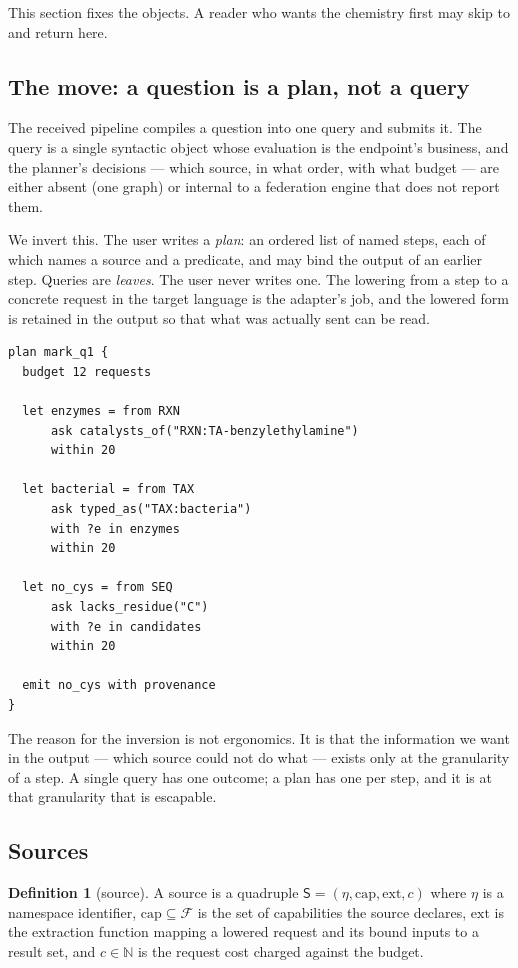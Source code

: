 \documentclass[11pt,a4paper]{article}
\theoremstyle{plain}
\theoremstyle{definition}
\newtheorem{definition}[theorem]{Definition}
\theoremstyle{remark}
\newcommand{\Src}{\mathsf{S}}
\newcommand{\Capset}{\mathrm{cap}}
\newcommand{\Ext}{\mathrm{ext}}
\newcommand{\Nset}{\mathbb{N}}
\newcommand{\cost}{c}
\newcommand{\Feat}{\mathcal{F}}
\begin{document}
This section fixes the objects. A reader who wants the chemistry first
may skip to  and return here.

\subsection{The move: a question is a plan, not a query}

The received pipeline compiles a question into one query and submits it.
The query is a single syntactic object whose evaluation is the
endpoint's business, and the planner's decisions --- which source, in
what order, with what budget --- are either absent (one graph) or
internal to a federation engine that does not report them.

We invert this. The user writes a \emph{plan}: an ordered list of named
steps, each of which names a source and a predicate, and may bind the
output of an earlier step. Queries are \emph{leaves}. The user never
writes one. The lowering from a step to a concrete request in the target
language is the adapter's job, and the lowered form is retained in the
output so that what was actually sent can be read.

\begin{lstlisting}[style=hfq,caption={A plan. Every step names its
source; no SPARQL appears anywhere.},label={lst:plan}]
plan mark_q1 {
  budget 12 requests

  let enzymes = from RXN
      ask catalysts_of("RXN:TA-benzylethylamine")
      within 20

  let bacterial = from TAX
      ask typed_as("TAX:bacteria")
      with ?e in enzymes
      within 20

  let no_cys = from SEQ
      ask lacks_residue("C")
      with ?e in candidates
      within 20

  emit no_cys with provenance
}
\end{lstlisting}

The reason for the inversion is not ergonomics. It is that the
information we want in the output --- which source could not do what ---
exists only at the granularity of a step. A single query has one
outcome; a plan has one per step, and it is at that granularity that
 is escapable.

\subsection{Sources}

\begin{definition}[source]
\label{def:source}
A source is a quadruple $\Src = (\eta, \Capset, \Ext, \cost)$ where
$\eta$ is a namespace identifier, $\Capset \subseteq \Feat$ is the set of
capabilities the source declares, $\Ext$ is the extraction function
mapping a lowered request and its bound inputs to a result set, and
$\cost \in \Nset$ is the request cost charged against the budget.
\end{definition}
\end{document}
